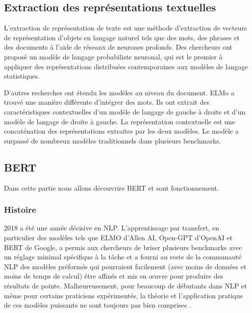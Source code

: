     \subsection{Extraction des représentations textuelles}
    \par L'extraction de représentation de texte est une méthode d'extraction de vecteurs de représentation d'objets en langage naturel tels que des mots, des phrases et des documents à l'aide de réseaux de neurones profonds. Des chercheurs ont proposé un modèle de langage probabiliste neuronal, qui est le premier à appliquer des représentations distribuées contemporaines aux modèles de langage statistiques. 
    
    \par D'autres recherches\cite{ch2ref18} ont étendu les modèles au niveau du document. ELMo\cite{ch2ref19} a trouvé une manière différente d'intégrer des mots. Ils ont extrait des caractéristiques contextuelles d'un modèle de langage de gauche à droite et d'un modèle de langage de droite à gauche. La représentation contextuelle est une concaténation des représentations extraites par les deux modèles. Le modèle a surpassé de nombreux modèles traditionnels dans plusieurs benchmarks.    
    
    
    \subsection{BERT }
    \par Dans cette partie nous allons découvrire BERT et sont fonctionnement.
        \subsubsection{Histoire}
        \par 2018 a été une année décisive en NLP. L’apprentissage par transfert, en particulier des modèles tels que ELMO d’Allen AI, Open-GPT d’OpenAI et BERT de Google, a permis aux chercheurs de briser plusieurs benchmarks avec un réglage minimal spécifique à la tâche et a fourni au reste de la communauté NLP des modèles préformés qui pourraient facilement (avec moins de données et moins de temps de calcul) être affinés et mis en œuvre pour produire des résultats de pointe. Malheureusement, pour beaucoup de débutants dans NLP et même pour certains praticiens expérimentés, la théorie et l’application pratique de ces modèles puissants ne sont toujours pas bien comprises \cite{ch2ref20}.
        
    
